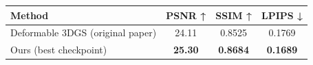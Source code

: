 \begin{table}[ht]
\vspace{-1.5mm}
\centering
\scriptsize
\vspace{-2mm}
\begin{tabular}{lccc}
\toprule
Method & PSNR ↑ & SSIM ↑ & LPIPS ↓ \\
\midrule
Deformable 3DGS (original paper) &24.11 &0.8525 &0.1769 \\
Ours (best checkpoint) &\textbf{25.30} &\textbf{0.8684} &\textbf{0.1689}\\
\bottomrule
\end{tabular}
\vspace{-6mm}
\end{table}